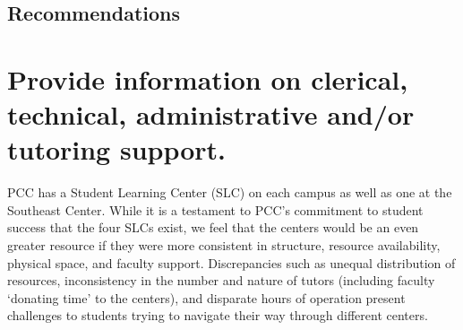 \subsection{Recommendations}



\section{Provide information on clerical, technical, administrative and/or tutoring support.}
PCC has a Student Learning Center (SLC) on each campus as well as one at  the
Southeast Center.  While it is a testament to PCC's commitment to student
success that the four SLCs exist, we feel that the centers would be an even
greater resource if they were more consistent in structure, resource
availability, physical space, and faculty support.  Discrepancies such as
unequal distribution of resources, inconsistency in the number and nature of
tutors (including faculty `donating time' to the centers), and disparate hours
of operation present challenges to students trying to navigate their way
through different centers. 

